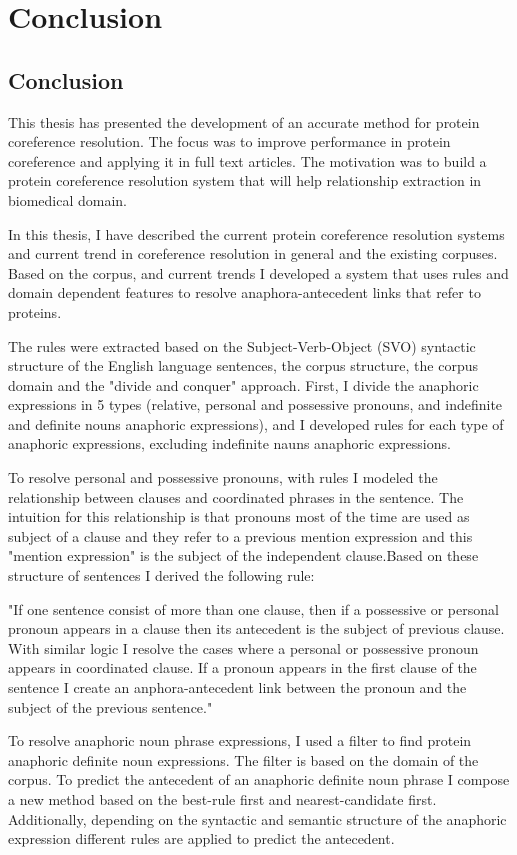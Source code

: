 \chapter{Conclusion}
\label{Conclusion}
\section{Conclusion}
This thesis has presented the development of an accurate method for protein coreference resolution. The focus was to  improve performance in protein coreference  and applying it in full text articles. The motivation was to build a protein coreference resolution system that will help relationship extraction in biomedical domain. 

In this thesis, I have described the current protein coreference resolution systems  and current trend in coreference resolution in general and the existing corpuses. Based on the corpus, and current trends I developed a system that uses rules and domain dependent features to resolve anaphora-antecedent links that refer to proteins.   

 The rules were extracted based on the Subject-Verb-Object (SVO) syntactic structure of the English language sentences, the corpus structure, the corpus domain and the "divide and conquer" approach. First, I divide the anaphoric expressions in 5 types (relative, personal and possessive pronouns, and indefinite and definite nouns anaphoric expressions), and I developed rules for each type of anaphoric expressions, excluding indefinite nauns anaphoric expressions.

To resolve personal and possessive pronouns, with rules I modeled the relationship between clauses and coordinated phrases in the sentence. The intuition for this relationship is that pronouns most of the time are used as subject of a clause and they refer to a previous mention expression and this  "mention expression" is the subject of the independent clause.Based on these structure of sentences I derived the following rule:

"If one sentence consist of more than one clause, then if  a possessive or personal pronoun appears in a clause then its antecedent is the subject of previous clause. With similar logic I resolve the cases where a personal or possessive pronoun  appears in coordinated clause. If a pronoun appears in the first clause of the sentence I create an anphora-antecedent link between the pronoun and the subject of the previous sentence."

To resolve anaphoric noun phrase expressions, I used a filter to find protein anaphoric definite noun expressions. The filter is based on the domain of the corpus. To predict the antecedent of an anaphoric definite noun phrase I compose a new method based on the best-rule first and nearest-candidate first. Additionally, depending on the syntactic and semantic structure of the anaphoric expression different rules are applied to predict the antecedent.

